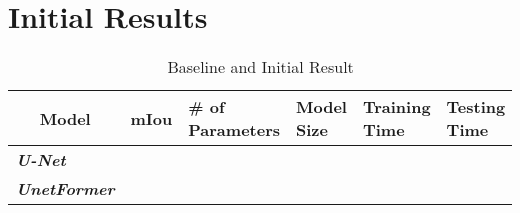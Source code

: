\FloatBarrier

\section{Initial Results}

\begin{table}[]
\begin{tabular}{|l|l|l|l|l|l|}
\hline
\multicolumn{1}{|c|}{\textbf{Model}} & \multicolumn{1}{c|}{\textbf{mIou}} & \textbf{\# of Parameters} & \textbf{Model Size} & \textbf{Training Time} & \textbf{Testing Time} \\ \hline
\textit{\textbf{U-Net}}              &                                    &                                    &                     &                        &                       \\ \hline
\textit{\textbf{UnetFormer}}         &                                    &                                    &                     &                        &                       \\ \hline
\end{tabular}
\caption{Baseline and Initial Result}
\label{tab:result}

\end{table}

